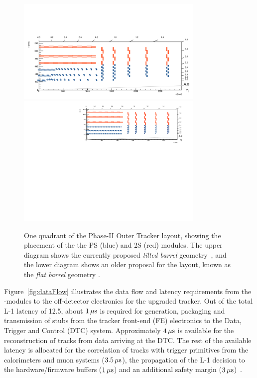 \begin{figure}[h]
\centering
\includegraphics[width=0.8\textwidth,trim={1.1truecm 0truecm 1truecm 12truecm},clip]{figs/tk-upgrade/tiltedbarrelmap.pdf}
\includegraphics[width=0.8\textwidth,trim={0.7truecm 0truecm 1truecm 0truecm},clip]{figs/tk-upgrade/mersilayout.pdf}
\caption{One quadrant of the Phase-II Outer Tracker layout, showing the placement of the the PS (blue) and 2S (red) modules. The upper diagram shows the currently proposed \emph{tilted barrel} geometry~\cite{P2TrackerTDR,tiltedGeometry}, and the lower diagram shows an older proposal for the layout, known as the \emph{flat barrel} geometry \cite{CMS_Upgrade_TP}.}
\label{fig:trackerlayout}
\end{figure}

Figure~\ref{fig:dataFlow} illustrates the data flow and latency requirements from the \pt-modules to the off-detector electronics for the upgraded tracker.
Out of the total L-1 latency of 12.5\mus, about $1\,\mu\text{s}$ is required for generation, packaging and transmission of stubs from the tracker front-end (FE) electronics to the Data, Trigger and Control (DTC) system. 
Approximately $4\,\mu\text{s}$ is available for the reconstruction of tracks from data arriving at the DTC.
The rest of the available latency is allocated for the correlation of tracks with trigger primitives from the calorimeters and muon systems ($3.5\,\mu\text{s}$), the propagation of the L-1 decision to the hardware/firmware  buffers ($1\,\mu\text{s}$) and an additional safety margin ($3\,\mu\text{s}$)~\cite{TMTT_JINST}.

